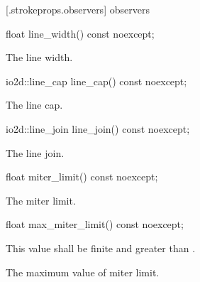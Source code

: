  [\iotwod.strokeprops.observers] { observers}

%
\begin{itemdecl}
float line_width() const noexcept;
\end{itemdecl}
\begin{itemdescr}
\pnum
\returns
The line width.
\end{itemdescr}

%
\begin{itemdecl}
io2d::line_cap line_cap() const noexcept;
\end{itemdecl}
\begin{itemdescr}
\pnum
\returns
The line cap.
\end{itemdescr}

%
\begin{itemdecl}
io2d::line_join line_join() const noexcept;
\end{itemdecl}
\begin{itemdescr}
\pnum
\returns
The line join.
\end{itemdescr}

%
\begin{itemdecl}
float miter_limit() const noexcept;
\end{itemdecl}
\begin{itemdescr}
\pnum
\returns
The miter limit.
\end{itemdescr}

%
\begin{itemdecl}
float max_miter_limit() const noexcept;
\end{itemdecl}
\begin{itemdescr}
\pnum
\requires
This value shall be finite and greater than .

\pnum
\returns
The  maximum value of miter limit.
\end{itemdescr}
